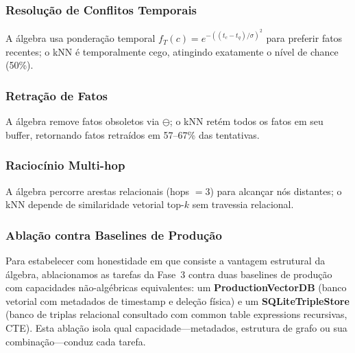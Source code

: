 \documentclass[11pt,a4paper]{article}
\theoremstyle{definition}
\begin{document}
\subsubsection{Resolu\c{c}\~ao de Conflitos Temporais}
A \'algebra usa pondera\c{c}\~ao temporal $f_T(c) = e^{-((t_c - t_q)/\sigma)^2}$ para preferir fatos recentes; o kNN \'e temporalmente cego, atingindo exatamente o n\'ivel de chance (50\%).

\subsubsection{Retra\c{c}\~ao de Fatos}
A \'algebra remove fatos obsoletos via $\ominus$; o kNN ret\'em todos os fatos em seu buffer, retornando fatos retra\'idos em 57--67\% das tentativas.

\subsubsection{Racioc\'inio Multi-hop}
A \'algebra percorre arestas relacionais (hops $= 3$) para alcan\c{c}ar n\'os distantes; o kNN depende de similaridade vetorial top-$k$ sem travessia relacional.

\subsubsection{Abla\c{c}\~ao contra Baselines de Produ\c{c}\~ao}

Para estabelecer com honestidade em que consiste a vantagem estrutural da \'algebra, ablacionamos as tarefas da Fase~3 contra duas baselines de produ\c{c}\~ao com capacidades n\~ao-alg\'ebricas equivalentes: um \textbf{ProductionVectorDB} (banco vetorial com metadados de timestamp e dele\c{c}\~ao f\'isica) e um \textbf{SQLiteTripleStore} (banco de triplas relacional consultado com common table expressions recursivas, CTE). Esta abla\c{c}\~ao isola qual capacidade---metadados, estrutura de grafo ou sua combina\c{c}\~ao---conduz cada tarefa.
\end{document}
